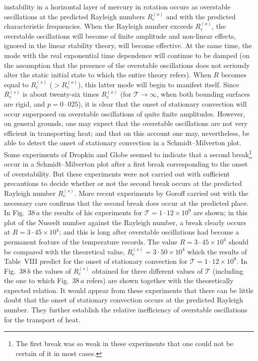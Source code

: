\noindent instability in a horizontal layer of mercury in rotation occurs as over\-stable
oscillations at the predicted Rayleigh numbers $R_c^{(o)}$ and with the
predicted characteristic frequencies.  When the Rayleigh number
exceeds $R_c^{(o)}$, the overstable oscillations will become of finite amplitude
and non-linear effects, ignored in the linear stability theory, will become
effective.  At the same time, the mode with the real exponential time
dependence will continue to be damped (on the assumption that the
presence of the overstable oscillations does not seriously alter the static
initial state to which the entire theory refers).  When $R$ becomes equal
to $R_c^{(s)}$ ($> R_c^{(o)}$), this latter mode will begin to manifest itself.  Since $R_c^{(s)}$
is about twenty-six times $R_c^{(o)}$ (for $\mathscr{T} \to \infty$, when both bounding surfaces
are rigid, and $p = 0{\cdot}025$), it is clear that the onset of stationary convec\-tion
will occur superposed on overstable oscillations of quite finite
amplitudes.  However, on general grounds, one may expect that the
overstable oscillations are not very efficient in transporting heat; and
that on this account one may, nevertheless, be able to detect the onset
of stationary convection in a Schmidt--Milverton plot.  Some experi\-ments
of Dropkin and Globe seemed to indicate that a second break\footnote{The first break was so weak in these experiments that one could not be certain of
it in most cases.}
occur in a Schmidt--Milverton plot after a first break corresponding to
the onset of overstability.  But these experiments were not carried out
with sufficient precautions to decide whether or not the second break
occurs at the predicted Rayleigh number $R_c^{(s)}$.  More recent experiments
by Goroff carried out with the necessary care confirms that the second
break does occur at the predicted place.  In Fig.~38\,$a$ the results of his
experiments for $\mathscr{T} = 1{\cdot}12 \times 10^9$ are shown; in this plot of the Nusselt
number against the Rayleigh number, a break clearly occurs at
$R = 3{\cdot}45 \times 10^4$; and this is long after overstable oscillations had become
a permanent feature of the temperature records.  The value
$R = 3{\cdot}45 \times 10^4$ should be compared with the theoretical value,
$R_c^{(s)} = 3{\cdot}50 \times 10^4$ which the results of Table~VIII predict for the onset
of stationary convection for $\mathscr{T} = 1{\cdot}12 \times 10^9$.  In Fig.~38\,$b$ the values of
$R_c^{(s)}$ obtained for three different values of $\mathscr{T}$ (including the one to which
Fig.~38\,$a$ refers) are shown together with the theoretically expected
relation.  It would appear from these experiments that there can be
little doubt that the onset of stationary convection occurs at the pre\-dicted
Rayleigh number.  They further establish the relative inefficiency
of overstable oscillations for the transport of heat.

